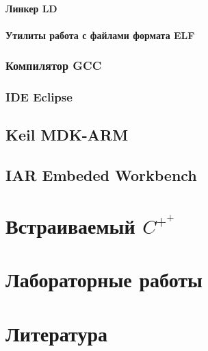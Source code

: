 \documentclass[oneside]{book}
\newcommand{\cpp}{$C^{+^{+}}$}
\begin{document}
\subsection{Линкер LD}
\subsection{Утилиты работа с файлами формата ELF}
\section{Компилятор GCC}
\section{IDE Eclipse}
\chapter{Keil MDK-ARM}
\chapter{IAR Embeded Workbench}

\part{Встраиваемый \cpp}

\part{Лабораторные работы}

\part{Литература}
\end{document}

